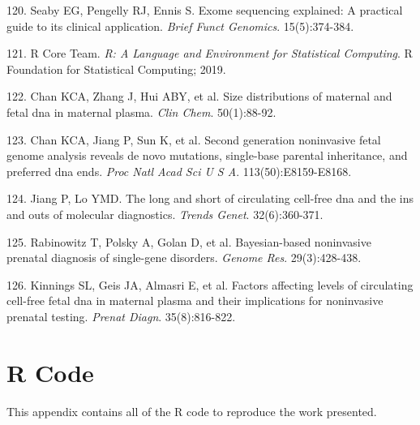 \documentclass[11pt,letterpaper]{book}
\begin{document}
\leavevmode\hypertarget{ref-seaby:2016aa}{}%
120. Seaby EG, Pengelly RJ, Ennis S. Exome sequencing explained: A practical guide to its clinical application. \emph{Brief Funct Genomics}. 15(5):374-384.

\leavevmode\hypertarget{ref-r-core-team:2019aa}{}%
121. R Core Team. \emph{R: A Language and Environment for Statistical Computing}. R Foundation for Statistical Computing; 2019.

\leavevmode\hypertarget{ref-chan:2004aa}{}%
122. Chan KCA, Zhang J, Hui ABY, et al. Size distributions of maternal and fetal dna in maternal plasma. \emph{Clin Chem}. 50(1):88-92.

\leavevmode\hypertarget{ref-chan:2016aa}{}%
123. Chan KCA, Jiang P, Sun K, et al. Second generation noninvasive fetal genome analysis reveals de novo mutations, single-base parental inheritance, and preferred dna ends. \emph{Proc Natl Acad Sci U S A}. 113(50):E8159-E8168.

\leavevmode\hypertarget{ref-jiang:2016ab}{}%
124. Jiang P, Lo YMD. The long and short of circulating cell-free dna and the ins and outs of molecular diagnostics. \emph{Trends Genet}. 32(6):360-371.

\leavevmode\hypertarget{ref-rabinowitz:2019aa}{}%
125. Rabinowitz T, Polsky A, Golan D, et al. Bayesian-based noninvasive prenatal diagnosis of single-gene disorders. \emph{Genome Res}. 29(3):428-438.

\leavevmode\hypertarget{ref-kinnings:2015aa}{}%
126. Kinnings SL, Geis JA, Almasri E, et al. Factors affecting levels of circulating cell-free fetal dna in maternal plasma and their implications for noninvasive prenatal testing. \emph{Prenat Diagn}. 35(8):816-822.

\hypertarget{appendix-appendix}{%
\appendix}


\hypertarget{r-code}{%
\chapter{R Code}\label{r-code}}

This appendix contains all of the R code to reproduce the work presented.
\end{document}
